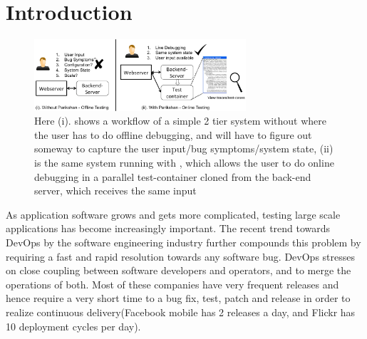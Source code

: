 \section{Introduction}
\label{sec:intro}


\begin{figure}[ht]
  \begin{center}
    \includegraphics[width=0.7\textwidth]{figs/motivation.eps}
    \caption{Here (i). shows a workflow of a simple 2 tier system without \parikshan where the user has to do offline debugging, and will have to figure out someway to capture the user input/bug symptoms/system state, (ii) is the same system running with \parikshan, which allows the user to do online debugging in a parallel test-container cloned from the back-end server, which receives the same input}
    \label{fig:motivation}
  \end{center}
\end{figure}


As application software grows and gets more complicated, testing large scale applications has become increasingly important. 
The recent trend towards DevOps\cite{devops} by the software engineering industry further compounds this problem by requiring a fast and rapid resolution towards any software bug.
DevOps stresses on close coupling between software developers and operators, and to merge the operations of both. 
Most of these companies have very frequent releases and hence require a very short time to a bug fix, test, patch and release in order to realize continuous delivery(Facebook mobile has 2 releases a day, and Flickr has 10 deployment cycles per day).

